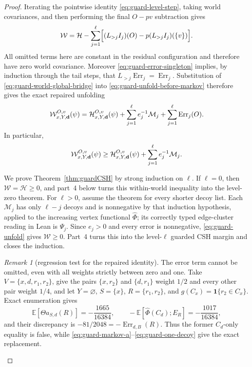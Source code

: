 \documentclass[11pt]{article}
\theoremstyle{definition}
\theoremstyle{remark}
\newtheorem{remark}[theorem]{Remark}
\newcommand{\EE}{\mathbb E}
\newcommand{\one}{\mathbf 1}
\begin{document}
\begin{proof}
Iterating the pointwise identity \eqref{eq:guard-level-step}, taking
world covariances, and then performing the final $O-pv$ subtraction gives
\begin{equation}
 \mathcal W
 =\mathcal H-
   \sum_{j=1}^{\ell}\Bigl[
      (L_{>j}I_j)(O)-p(L_{>j}I_j)(\{v\})\Bigr].
 \label{eq:guard-unfold-before-markov}
\end{equation}
All omitted terms here are constant in the residual configuration and
therefore have zero world covariance.  Moreover
\eqref{eq:guard-error-singleton} implies, by induction through the tail
steps, that $L_{>j}\operatorname{Err}_j=\operatorname{Err}_j$.
Substitution of \eqref{eq:guard-world-global-bridge} into
\eqref{eq:guard-unfold-before-markov} therefore gives the exact repaired
unfolding
\begin{equation}\label{eq:guard-unfold}
 \mathcal W_{x,Y,{\bf d}}^{O,v}(\psi)
 =\mathcal H_{x,Y,{\bf d}}^{O,v}(\psi)
  +\sum_{j=1}^{\ell}e_j^{-1}\mathcal M_j
  +\sum_{j=1}^{\ell}\operatorname{Err}_j(O).
\end{equation}
In particular,
\begin{equation}\label{eq:guard-unfold-lower}
 \mathcal W_{x,Y,{\bf d}}^{O,v}(\psi)
 \geq\mathcal H_{x,Y,{\bf d}}^{O,v}(\psi)
  +\sum_{j=1}^{\ell}e_j^{-1}\mathcal M_j.
\end{equation}

We prove Theorem~\ref{thm:guardCSH} by strong induction on $\ell$.  If
$\ell=0$, then $\mathcal W=\mathcal H\geq0$, and part~4 below turns this
within-world inequality into the level-zero theorem.  For $\ell>0$,
assume the theorem for every shorter decoy list.  Each $\mathcal M_j$
has only $\ell-j$ decoys and is nonnegative by that induction hypothesis,
applied to the increasing vertex functional $\widehat\Phi$; its correctly
typed edge-cluster reading in Lean is $\Psi_j$.  Since $e_j>0$ and every
error is nonnegative, \eqref{eq:guard-unfold} gives $\mathcal W\geq0$.
Part~4 turns this into the level-$\ell$ guarded CSH margin and closes the
induction.

\begin{remark}[regression test for the repaired identity]
The error term cannot be omitted, even with all weights strictly between
zero and one.  Take
$V=\{x,d,r_1,r_2\}$, give the pairs $\{x,r_2\}$ and $\{d,r_1\}$ weight
$1/2$ and every other pair weight $1/4$, and let
$Y=\varnothing$, $S=\{x\}$, $R=\{r_1,r_2\}$, and
$g(C_x)=\one\{r_2\in C_x\}$.  Exact enumeration gives
\[
 \EE[\Theta a_{S,d}(R)]=-\frac{1665}{16384},\qquad
 -\EE[\widehat\Phi(C_d);E_R]=-\frac{1017}{16384},
\]
and their discrepancy is
$-81/2048=-\operatorname{Err}_{d,B}(R)$.  Thus the former
$C_d$-only equality is false, while
\eqref{eq:guard-markov-a}--\eqref{eq:guard-one-decoy} give the exact
replacement.
\end{remark}


\end{proof}
\end{document}
